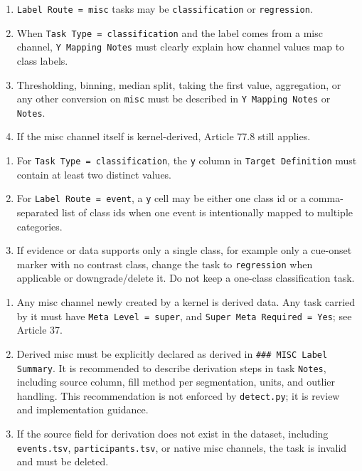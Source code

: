\begin{tcolorbox}
\begin{enumerate}[leftmargin=1.5em,noitemsep,topsep=2pt]
\item \texttt{Label Route = misc} tasks may be \texttt{classification} or \texttt{regression}.
\item When \texttt{Task Type = classification} and the label comes from a misc channel, \texttt{Y Mapping Notes} must clearly explain how channel values map to class labels.
\item Thresholding, binning, median split, taking the first value, aggregation, or any other conversion on \texttt{misc} must be described in \texttt{Y Mapping Notes} or \texttt{Notes}.
\item If the misc channel itself is kernel-derived, Article 77.8 still applies.
\end{enumerate}

\smallskip{}\par\smallskip

\begin{enumerate}[leftmargin=1.5em,noitemsep,topsep=2pt]
\item For \texttt{Task Type = classification}, the \texttt{y} column in \texttt{Target Definition} must contain at least two distinct values.
\item For \texttt{Label Route = event}, a \texttt{y} cell may be either one class id or a comma-separated list of class ids when one event is intentionally mapped to multiple categories.
\item If evidence or data supports only a single class, for example only a cue-onset marker with no contrast class, change the task to \texttt{regression} when applicable or downgrade/delete it. Do not keep a one-class classification task.
\end{enumerate}

\smallskip{}\par\smallskip

\begin{enumerate}[leftmargin=1.5em,noitemsep,topsep=2pt]
\item Any misc channel newly created by a kernel is derived data. Any task carried by it must have \texttt{Meta Level = super}, and \texttt{Super Meta Required = Yes}; see Article 37.
\item Derived misc must be explicitly declared as derived in \texttt{\#\#\# MISC Label Summary}. It is recommended to describe derivation steps in task \texttt{Notes}, including source column, fill method per segmentation, units, and outlier handling. This recommendation is not enforced by \texttt{detect.py}; it is review and implementation guidance.
\item If the source field for derivation does not exist in the dataset, including \texttt{events.tsv}, \texttt{participants.tsv}, or native misc channels, the task is invalid and must be deleted.
\end{enumerate}


\end{tcolorbox}
